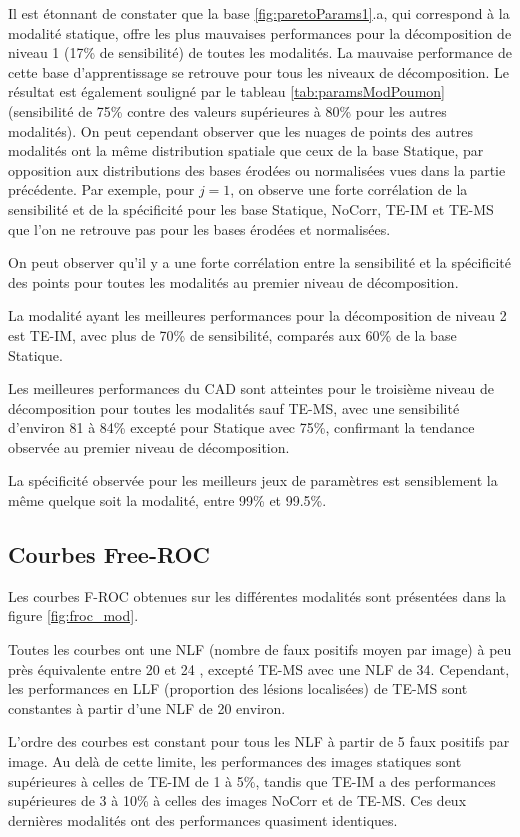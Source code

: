 Il est étonnant de constater que la base \ref{fig:paretoParams1}.a, qui correspond à la modalité statique, offre les plus mauvaises performances pour la décomposition de niveau 1 (17\% de sensibilité) de toutes les modalités. La mauvaise performance de cette base d'apprentissage se retrouve pour tous les niveaux de décomposition. Le résultat est également souligné par le tableau \ref{tab:paramsModPoumon} (sensibilité de 75\% contre des valeurs supérieures à 80\% pour les autres modalités). On peut cependant observer que les nuages de points des autres modalités ont la même distribution spatiale que ceux de la base Statique, par opposition aux distributions des bases érodées ou normalisées vues dans la partie précédente. Par exemple, pour $j=1$, on observe une forte corrélation de la sensibilité et de la spécificité pour les base Statique, NoCorr, TE-IM et TE-MS que l'on ne retrouve pas pour les bases érodées et normalisées. 

On peut observer qu'il y a une forte corrélation entre la sensibilité et la spécificité des points pour toutes les modalités au premier niveau de décomposition.

La modalité ayant les meilleures performances pour la décomposition de niveau 2 est TE-IM, avec plus de 70\% de sensibilité, comparés aux 60\% de la base Statique. 

Les meilleures performances du CAD sont atteintes pour le troisième niveau de décomposition pour toutes les modalités sauf TE-MS, avec une sensibilité d'environ 81 à 84\% excepté pour Statique avec 75\%, confirmant la tendance observée au premier niveau de décomposition.

La spécificité observée pour les meilleurs jeux de paramètres est sensiblement la même quelque soit la modalité, entre 99\% et 99.5\%.

\subsection{Courbes Free-ROC}

Les courbes F-ROC obtenues sur les différentes modalités sont présentées dans la figure \ref{fig:froc_mod}. 

Toutes les courbes ont une NLF (nombre de faux positifs moyen par image) à peu près équivalente entre 20 et 24 , excepté TE-MS avec une NLF de 34. Cependant, les performances en LLF (proportion des lésions localisées) de TE-MS sont constantes à partir d'une NLF de 20 environ. 

L'ordre des courbes est constant pour tous les NLF à partir de 5 faux positifs par image. Au delà de cette limite, les performances des images statiques sont supérieures à celles de TE-IM de 1 à 5\%, tandis que TE-IM a des performances supérieures de 3 à 10\% à celles des images NoCorr et de TE-MS. Ces deux dernières modalités ont des performances quasiment identiques.

